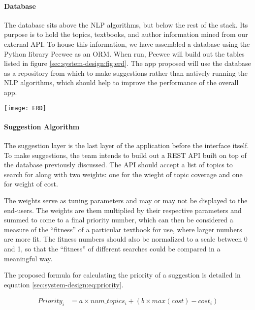\paragraph{Database}
The database sits above the NLP algorithms, but below the rest of the
stack.
Its purpose is to hold the topics, textbooks, and author information
mined from our external API.  
To house this information, we have assembled a database using the
Python library Peewee as an ORM.
When run, Peewee will build out the tables listed in figure \ref{sec:system-design:fig:erd}.
The app proposed will use the database as a repository from which to
make suggestions rather than natively running the NLP algorithms,
which should help to improve the performance of the overall app.

\begin{figure*}[h]
\label{sec:system-design:fig:erd}
\caption{ERD of Proposed Database}
\centering
\texttt{[image: ERD]}
\end{figure*}

\paragraph{Suggestion Algorithm}
The suggestion layer is the last layer of the application before the
interface itself.
To make suggestions, the team intends to build out a REST API built on
top of the database previously discussed.
The API should accept a list of topics to search for along with two
weights: one for the wieght of topic coverage and one for weight of
cost.

The weights serve as tuning parameters and may or may not be displayed
to the end-users.
The weights are them multiplied by their respective parameters and
summed to come to a final priority number, which can then be
considered a measure of the ``fitness'' of a particular textbook for
use, where larger numbers are more fit.
The fitness numbers should also be normalized to a scale between 0 and
1, so that the ``fitness'' of different searches could be compared in
a meaningful way.

The proposed formula for calculating the priority of a suggestion is
detailed in equation \ref{sec:system-design:eq:priority}.


\begin{align}
Priority_i &= a \times num\_topics_i + (b \times max(cost) - cost_i) \label{sec:system-design:eq:priority}
\end{align}

